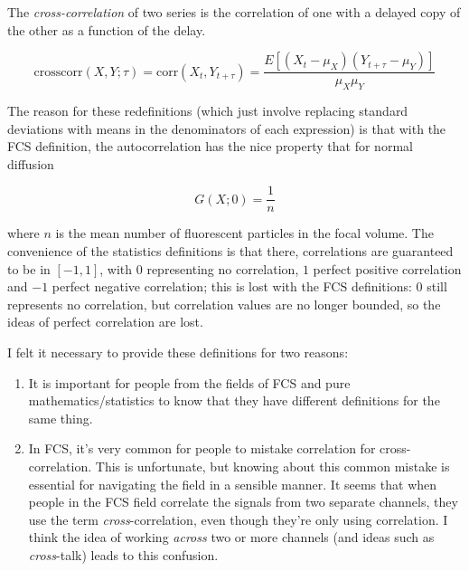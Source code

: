 \documentclass[12pt,]{book}
\providecommand{\tightlist}{%
  \setlength{\itemsep}{0pt}\setlength{\parskip}{0pt}}
\theoremstyle{definition}
\theoremstyle{definition}
\theoremstyle{definition}
\theoremstyle{remark}
\let\BeginKnitrBlock\begin \let\EndKnitrBlock\end
\begin{document}
\BeginKnitrBlock{definition}[FCS]
\protect\hypertarget{def:unnamed-chunk-24}{}{\label{def:unnamed-chunk-24}
\iffalse (FCS) \fi{} }The \emph{cross-correlation} of two series is the
correlation of one with a delayed copy of the other as a function of the
delay.

\begin{equation}
\text{crosscorr}(X, Y; \tau) = \text{corr}(X_t, Y_{t + \tau}) = \frac{E[(X_t - \mu_X)(Y_{t + \tau} - \mu_Y)]}{\mu_X \mu_Y}
\label{eq:FCScrosscorrelation}
\end{equation}
\EndKnitrBlock{definition}

The reason for these redefinitions (which just involve replacing
standard deviations with means in the denominators of each expression)
is that with the FCS definition, the autocorrelation has the nice
property that for normal diffusion

\begin{equation}
G(X; 0) = \frac{1}{n}
\label{eq:FCSautocorrprop}
\end{equation}

where \(n\) is the mean number of fluorescent particles in the focal
volume. The convenience of the statistics definitions is that there,
correlations are guaranteed to be in \([-1, 1]\), with \(0\)
representing no correlation, \(1\) perfect positive correlation and
\(-1\) perfect negative correlation; this is lost with the FCS
definitions: 0 still represents no correlation, but correlation values
are no longer bounded, so the ideas of perfect correlation are lost.

I felt it necessary to provide these definitions for two reasons:

\begin{enumerate}
\def\labelenumi{\arabic{enumi}.}
\tightlist
\item
  It is important for people from the fields of FCS and pure
  mathematics/statistics to know that they have different definitions
  for the same thing.
\item
  In FCS, it's very common for people to mistake correlation for
  cross-correlation. This is unfortunate, but knowing about this common
  mistake is essential for navigating the field in a sensible manner. It
  seems that when people in the FCS field correlate the signals from two
  separate channels, they use the term \emph{cross}-correlation, even
  though they're only using correlation. I think the idea of working
  \emph{across} two or more channels (and ideas such as
  \emph{cross}-talk) leads to this confusion.
\end{enumerate}
\end{document}
